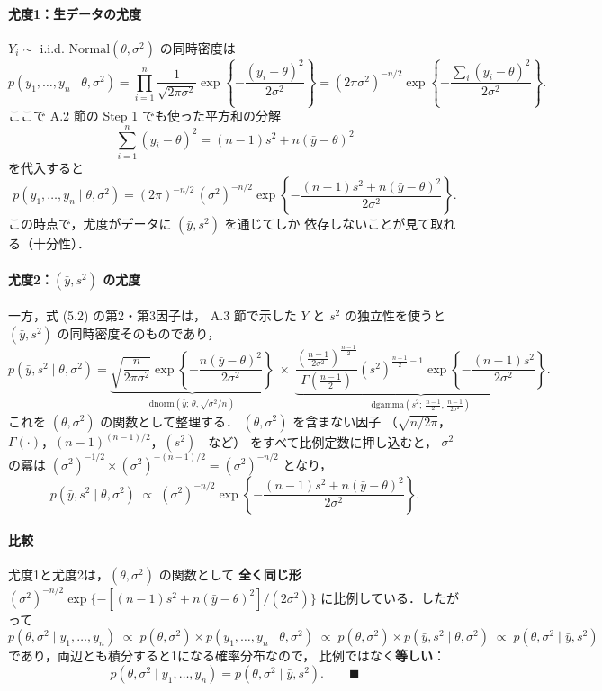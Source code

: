 \documentclass[lualatex,ja=standard,a4paper,12pt]{bxjsarticle}
\begin{document}
\paragraph{尤度1：生データの尤度}
$Y_i \sim$ i.i.d. $\mathrm{Normal}(\theta, \sigma^2)$ の同時密度は
\[
  p(y_1, \ldots, y_n \mid \theta, \sigma^2)
  = \prod_{i=1}^n \frac{1}{\sqrt{2\pi\sigma^2}}
    \exp\!\left\{-\frac{(y_i - \theta)^2}{2\sigma^2}\right\}
  = (2\pi\sigma^2)^{-n/2}
    \exp\!\left\{-\frac{\sum_i (y_i - \theta)^2}{2\sigma^2}\right\}.
\]
ここで A.2 節の Step 1 でも使った平方和の分解
\[
  \sum_{i=1}^n (y_i - \theta)^2 = (n-1)s^2 + n(\bar{y} - \theta)^2
\]
を代入すると
\[
  p(y_1, \ldots, y_n \mid \theta, \sigma^2)
  = (2\pi)^{-n/2} \,(\sigma^2)^{-n/2}
    \exp\!\left\{-\frac{(n-1)s^2 + n(\bar{y} - \theta)^2}{2\sigma^2}\right\}.
\]
この時点で，尤度がデータに $(\bar{y}, s^2)$ を通じてしか
依存しないことが見て取れる（十分性）．

\paragraph{尤度2：$(\bar{y}, s^2)$ の尤度}
一方，式 (5.2) の第2・第3因子は，
A.3 節で示した $\bar{Y}$ と $s^2$ の独立性を使うと
$(\bar{y}, s^2)$ の同時密度そのものであり，
\[
  p(\bar{y}, s^2 \mid \theta, \sigma^2)
  = \underbrace{\sqrt{\frac{n}{2\pi\sigma^2}}
    \exp\!\left\{-\frac{n(\bar{y}-\theta)^2}{2\sigma^2}\right\}}_{
      \mathrm{dnorm}(\bar{y};\,\theta,\sqrt{\sigma^2/n})}
  \;\times\;
  \underbrace{\frac{\left(\frac{n-1}{2\sigma^2}\right)^{\frac{n-1}{2}}}{\Gamma\!\left(\frac{n-1}{2}\right)}
    (s^2)^{\frac{n-1}{2}-1}
    \exp\!\left\{-\frac{(n-1)s^2}{2\sigma^2}\right\}}_{
      \mathrm{dgamma}\left(s^2;\,\frac{n-1}{2},\,\frac{n-1}{2\sigma^2}\right)}.
\]
これを $(\theta, \sigma^2)$ の関数として整理する．
$(\theta, \sigma^2)$ を含まない因子
（$\sqrt{n/2\pi}$，$\Gamma(\cdot)$，$(n-1)^{(n-1)/2}$，$(s^2)^{\cdots}$ など）
をすべて比例定数に押し込むと，
$\sigma^2$ の冪は $(\sigma^2)^{-1/2} \times (\sigma^2)^{-(n-1)/2}
= (\sigma^2)^{-n/2}$ となり，
\[
  p(\bar{y}, s^2 \mid \theta, \sigma^2)
  \;\propto\;
  (\sigma^2)^{-n/2}
    \exp\!\left\{-\frac{(n-1)s^2 + n(\bar{y} - \theta)^2}{2\sigma^2}\right\}.
\]

\paragraph{比較}
尤度1と尤度2は，$(\theta, \sigma^2)$ の関数として
\textbf{全く同じ形} $(\sigma^2)^{-n/2}
\exp\{-[(n-1)s^2 + n(\bar{y}-\theta)^2]/(2\sigma^2)\}$
に比例している．したがって
\[
  p(\theta, \sigma^2 \mid y_1, \ldots, y_n)
  \;\propto\; p(\theta, \sigma^2) \times p(y_1, \ldots, y_n \mid \theta, \sigma^2)
  \;\propto\; p(\theta, \sigma^2) \times p(\bar{y}, s^2 \mid \theta, \sigma^2)
  \;\propto\; p(\theta, \sigma^2 \mid \bar{y}, s^2)
\]
であり，両辺とも積分すると1になる確率分布なので，
比例ではなく\textbf{等しい}：
\[
  p(\theta, \sigma^2 \mid y_1, \ldots, y_n)
  = p(\theta, \sigma^2 \mid \bar{y}, s^2).
  \qquad \blacksquare
\]
\end{document}
